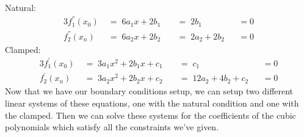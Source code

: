 \documentclass[11pt]{article}
\begin{document}
\begin{enumerate}
            Natural:
            \begin{alignat}{3}
                f^{''}_1(x_0) \;&=\; 6a_1x + 2b_1 \;&&=\; 2b_1 & &= 0 \\
                f^{''}_2(x_n) \;&=\; 6a_2x + 2b_2 \;&&=\; 2a_2 + 2b_2 & &= 0
            \end{alignat}
            Clamped:
            \begin{alignat}{3}
                f^{'}_1(x_0) \;&=\; 3a_1x^2 + 2b_1x + c_1 \;&&=\; c_1 & &= 0 \\
                f^{'}_2(x_n) \;&=\; 3a_2x^2 + 2b_2x + c_2 \;&&=\; 12a_2 + 4b_2 + c_2& &= 0
            \end{alignat}
            Now that we have our boundary conditions setup, we can setup two
            different linear systems of these equations, one with the natural
            condition and one with the clamped. Then we can solve these systems
            for the coefficients of the cubic polynomials which satisfy all the
            constraints we've given.


\end{enumerate}
\end{document}
